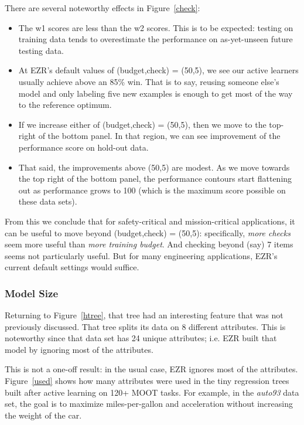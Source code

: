 \documentclass[AMA,STIX2COL]{WileyNJDv5}
\begin{document}
There are several noteworthy effects in     Figure~\ref{check}:
\begin{itemize}
\item The \textsf{w1} scores
are less than the \textsf{w2} scores. This is to be expected:
testing on training data tends to overestimate the performance on as-yet-unseen future testing data. 
\item At EZR's default values of (\textsf{budget},\textsf{check}) = (50,5),
we see our active learners usually achieve above an  85\% \textsf{win}.
That is to say, reusing someone else's model and only labeling five new examples
is enough to get most of the way to the reference optimum. 
\item
If we increase either of  (\textsf{budget},\textsf{check}) = (50,5), then we move to the top-right
of the bottom panel. In that region, we can see improvement of    the performance score on hold-out data.

\item
That said, the improvements above (50,5) are modest.   As we move towards the top right of the bottom panel, the performance contours start flattening
out as  performance grows to 100 (which is the maximum score possible on these data sets).
\end{itemize}
From this we conclude that for safety-critical and mission-critical applications,
it can be useful to move beyond (\textsf{budget},\textsf{check}) = (50,5): specifically,
{\em more checks} seem more useful than {\em more training budget}. And checking beyond (say) 7 items
seems not particularly useful. 
But for many engineering applications, EZR's current default settings would  suffice. 


\subsubsection{Model Size}

 
Returning to Figure~\ref{htree}, that tree 
had an interesting feature that was not previously discussed. 
That tree splits its data on 8 different  attributes.
This is noteworthy since that data  set has 24 unique attributes;
i.e. EZR  built that model by ignoring most of the attributes.


This is not a one-off result: in the usual case,
EZR ignores most of the attributes.
Figure~\ref{used} shows how many attributes were used
in the tiny regression trees built after active
learning on   120+ MOOT tasks. 
 For example, in the {\em auto93} data set,
the goal is to maximize miles-per-gallon and acceleration without
increasing the weight of the car.
\end{document}

